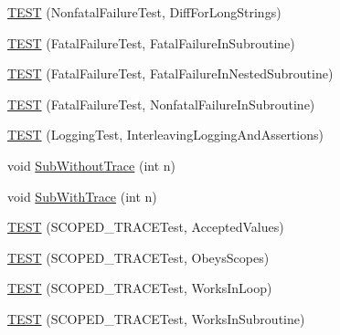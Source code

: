 \begin{DoxyCompactItemize}
\item 
\mbox{\hyperlink{_obj__test_2lib_2googletest-release-1_88_81_2googletest_2test_2googletest-output-test___8cc_aaa6c1704a62b7412fd5e053614f47650}{T\+E\+ST}} (Nonfatal\+Failure\+Test, Diff\+For\+Long\+Strings)
\item 
\mbox{\hyperlink{_obj__test_2lib_2googletest-release-1_88_81_2googletest_2test_2googletest-output-test___8cc_a6076f79ee5f9e8982bba181cbbebb0ed}{T\+E\+ST}} (Fatal\+Failure\+Test, Fatal\+Failure\+In\+Subroutine)
\item 
\mbox{\hyperlink{_obj__test_2lib_2googletest-release-1_88_81_2googletest_2test_2googletest-output-test___8cc_a8763e3844bd21de9bd7126658a4279c5}{T\+E\+ST}} (Fatal\+Failure\+Test, Fatal\+Failure\+In\+Nested\+Subroutine)
\item 
\mbox{\hyperlink{_obj__test_2lib_2googletest-release-1_88_81_2googletest_2test_2googletest-output-test___8cc_afe609aef34a68a2ab9809eb48112c5cc}{T\+E\+ST}} (Fatal\+Failure\+Test, Nonfatal\+Failure\+In\+Subroutine)
\item 
\mbox{\hyperlink{_obj__test_2lib_2googletest-release-1_88_81_2googletest_2test_2googletest-output-test___8cc_ad9bbf46060935b29c42d3116ddbc3566}{T\+E\+ST}} (Logging\+Test, Interleaving\+Logging\+And\+Assertions)
\item 
void \mbox{\hyperlink{_obj__test_2lib_2googletest-release-1_88_81_2googletest_2test_2googletest-output-test___8cc_a7e222b468bbde7215ce826f10993e746}{Sub\+Without\+Trace}} (int n)
\item 
void \mbox{\hyperlink{_obj__test_2lib_2googletest-release-1_88_81_2googletest_2test_2googletest-output-test___8cc_a543ee38e0824e47113bb12c3277e09ae}{Sub\+With\+Trace}} (int n)
\item 
\mbox{\hyperlink{_obj__test_2lib_2googletest-release-1_88_81_2googletest_2test_2googletest-output-test___8cc_a81f7d012241339866fccb3c3750b553b}{T\+E\+ST}} (S\+C\+O\+P\+E\+D\+\_\+\+T\+R\+A\+C\+E\+Test, Accepted\+Values)
\item 
\mbox{\hyperlink{_obj__test_2lib_2googletest-release-1_88_81_2googletest_2test_2googletest-output-test___8cc_a82f82f6a7caa426cccf8d20113f897c0}{T\+E\+ST}} (S\+C\+O\+P\+E\+D\+\_\+\+T\+R\+A\+C\+E\+Test, Obeys\+Scopes)
\item 
\mbox{\hyperlink{_obj__test_2lib_2googletest-release-1_88_81_2googletest_2test_2googletest-output-test___8cc_a46dcedbe67765adaebc7740ee17a88de}{T\+E\+ST}} (S\+C\+O\+P\+E\+D\+\_\+\+T\+R\+A\+C\+E\+Test, Works\+In\+Loop)
\item 
\mbox{\hyperlink{_obj__test_2lib_2googletest-release-1_88_81_2googletest_2test_2googletest-output-test___8cc_a492695898501cea9f99ccd690c2b3991}{T\+E\+ST}} (S\+C\+O\+P\+E\+D\+\_\+\+T\+R\+A\+C\+E\+Test, Works\+In\+Subroutine)

\end{DoxyCompactItemize}
